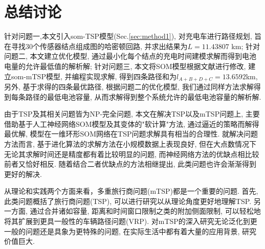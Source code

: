 \section{总结讨论}

针对问题一,本文引入som-TSP模型(Sec.\ref{sec:method1}), 对充电车进行路径规划, 旨在寻找30个传感器结点组成图的哈密顿回路, 并求出结果为$L = 11.43807$ km;
针对问题二, 本文建立优化模型, 通过最小化每个结点的充电时间建模求解而得到电池电量的允许最低值的解析解;
针对问题三, 本文将SOM模型根据文献\cite{som-mtsp}进行修改, 建立som-mTSP模型, 并编程实现求解, 得到四条路径和为$l_{A+B+D+C} = 13.6592$km, 另外, 基于求得的四条最优路径, 根据问题二的优化模型, 我们通过同样方法求解得到每条路径的最低电池容量, 从而求解得到整个系统允许的最低电池容量的解析解.

由于TSP及其相关问题皆为NP-完全问题, 本文在解决TSP以及mTSP问题上, 主要借助基于人工神经网络SOM模型及其变体的"软计算"方法, 通过逼近的策略而解得最优解, 模型在一维环形SOM网络在TSP问题求解具有相当的合理性. 就解决问题方法而言, 基于进化算法的求解方法在小规模数据上表现良好, 但在大点数情况下无论其求解时间还是精度都有着比较明显的问题, 而神经网络方法的优缺点相比较前者又恰好相反. 随着结合二者优缺点的方法相继提出, 此类问题也许会渐渐得到更好的解决.

从理论和实践两个方面来看，多重旅行商问题(mTSP)都是一个重要的问题. 首先, 此类问题概括了旅行商问题(TSP), 可以进行研究以从理论角度更好地理解TSP. 另一方面, 通过合并诸如容量, 距离和时间窗口限制之类的附加侧面限制, 可以轻松地将其扩展到更具一般性的车辆路径问题(VRP). 对mTSP的深入研究无论泛化到更一般的问题还是具象为更特殊的问题, 在实际生活中都有着大量的应用背景, 研究价值巨大.



